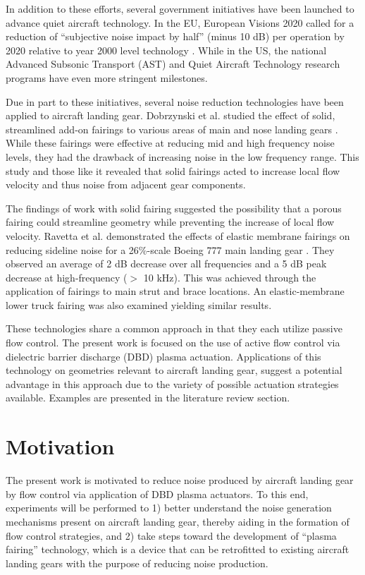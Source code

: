 In addition to these efforts, several government initiatives have been launched to advance quiet aircraft technology. In the EU, European Visions 2020 called for a reduction of ``subjective noise impact by half'' (minus 10 dB) per operation by 2020 relative to year 2000 level technology \cite{busquin2001}. While in the US, the national Advanced Subsonic Transport (AST) and Quiet Aircraft Technology research programs have even more stringent milestones.

Due in part to these initiatives, several noise reduction technologies have been applied to aircraft landing gear. 
Dobrzynski et al. studied the effect of solid, streamlined add-on fairings to various areas of main and nose landing gears \cite{dob2002}. While these fairings were effective at reducing mid and high frequency noise levels, they had the drawback of increasing noise in the low frequency range. This study and those like it revealed that solid fairings acted to increase local flow velocity and thus noise from adjacent gear components.

The findings of work with solid fairing suggested the possibility that a porous fairing could streamline geometry while preventing the increase of local flow velocity.
Ravetta et al. demonstrated the effects of elastic membrane fairings on reducing sideline noise for a 26\%-scale Boeing 777 main landing gear \cite{ravetta2008}. They observed an average of 2 dB decrease over all frequencies and a 5 dB peak decrease at high-frequency ($>$ 10 kHz). This was achieved through the application of fairings to main strut and brace locations. An elastic-membrane lower truck fairing was also examined yielding similar results.

These technologies share a common approach in that they each utilize passive flow control. The present work is focused on the use of active flow control via dielectric barrier discharge (DBD) plasma actuation. Applications of this technology on geometries relevant to aircraft landing gear, suggest a potential advantage in this approach due to the variety of possible actuation strategies available. Examples are presented in the literature review section.

\section{Motivation}
The present work is motivated to reduce noise produced by aircraft landing gear by flow control via application of DBD plasma actuators. To this end, experiments will be performed to 
1) better understand the noise generation mechanisms present on aircraft landing gear, thereby aiding in the formation of flow control strategies, and 2) take steps toward the development of ``plasma fairing'' technology, which is a device that can be retrofitted to existing aircraft landing gears with the purpose of reducing noise production.

